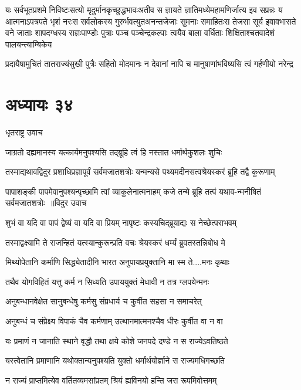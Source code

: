 यः सर्वभूतप्रशमे निविष्टःसत्यो मृदुर्मानकृच्छुद्धभावःअतीव स ज्ञायते ज्ञातिमध्येमहामणिर्जात्य इव सप्रन्नः
य आत्मनाऽपत्रपते भृशं नरःस सर्वलोकस्य गुरुर्भवत्युतअनन्तजेजाः सुमनाः समाहितःस तेजसा सूर्य इवावभासते
\twolineshloka
{वने जाताः शापदग्धस्य राज्ञःपाण्डोः पुत्राः पञ्च पञ्चेन्द्रकल्पाः}
{त्वयैव बाला वर्धिताः शिक्षिताश्चतवादेशं पालयन्त्याम्बिकेय}


\twolineshloka
{प्रदायैषामुचितं तातराज्यंसुखी पुत्रैः सहितो मोदमानः}
{न देवानां नापि च मानुषाणांभविष्यसि त्वं गर्हणीयो नरेन्द्र}


\chapter{अध्यायः ३४}
\twolineshloka
{धृतराष्ट्र उवाच}
{}


\twolineshloka
{जाग्रतो दह्यमानस्य यत्कार्यमनुपश्यसि}
{तद्ब्रूहि त्वं हि नस्तात धर्मार्थकुशलः शुचिः}


\twolineshloka
{तस्माद्यथावद्विदुर प्रशाधिप्रज्ञापूर्वं सर्वमजातशत्रोः}
{यन्मन्यसे पथ्यमदीनसत्वश्रेयस्करं ब्रूहि तद्वै कुरूणाम्}


\threelineshloka
{पापाशङ्की पापमेवानुपश्यन्पृच्छामि त्वां व्याकुलेनात्मनाहम्}
{कजे तन्मे ब्रूहि तत्पं यथाव-न्मनीषितं सर्वमजातशत्रोः ॥विदुर उवाच}
{}


\twolineshloka
{शुभं वा यदि वा पापं द्वेष्यं वा यदि वा प्रियम्}
{नापृष्टः कस्यचिद्ब्रूयाद्यः स नेच्छेत्पराभवम्}


\twolineshloka
{तस्माद्वक्ष्यामि ते राजन्हितं यत्स्यान्कुरून्प्रति}
{वचः श्रेयस्करं धर्म्यं ब्रुवतस्तन्निबोध मे}


\twolineshloka
{मिथ्योपेतानि कर्माणि सिद्ध्येतादीनि भारत}
{अनुपायप्रयुक्तानि मा स्म ते....मनः कृथाः}


\twolineshloka
{तथैव योगविहितं यत्तु कर्म न सिध्यति}
{उपाययुक्तं मेधावी न तत्र ग्लपयेन्मनः}


\twolineshloka
{अनुबन्धानवेक्षेत सानुबन्धेषु कर्मसु}
{संप्रधार्य च कुर्वीत सहसा न समाचरेत्}


\twolineshloka
{अनुबन्धं च संप्रेक्ष्य विपाकं चैव कर्मणाम्}
{उत्थानमात्मनश्चैव धीरः कुर्वीत वा न वा}


\twolineshloka
{यः प्रमाणं न जानाति स्थाने वृद्धौ तथा क्षये}
{कोशे जनपदे दण्डे न स राज्येऽवतिष्ठते}


\twolineshloka
{यस्त्वेतानि प्रमाणानि यथोक्तान्यनुपश्यति}
{युक्तो धर्मार्थयोर्ज्ञाने स राज्यमधिगच्छति}


\twolineshloka
{न राज्यं प्राप्तमित्येव वर्तितव्यमसांप्रतम्}
{श्रियं ह्यविनयो हन्ति जरा रूपमिवोत्तमम्}


